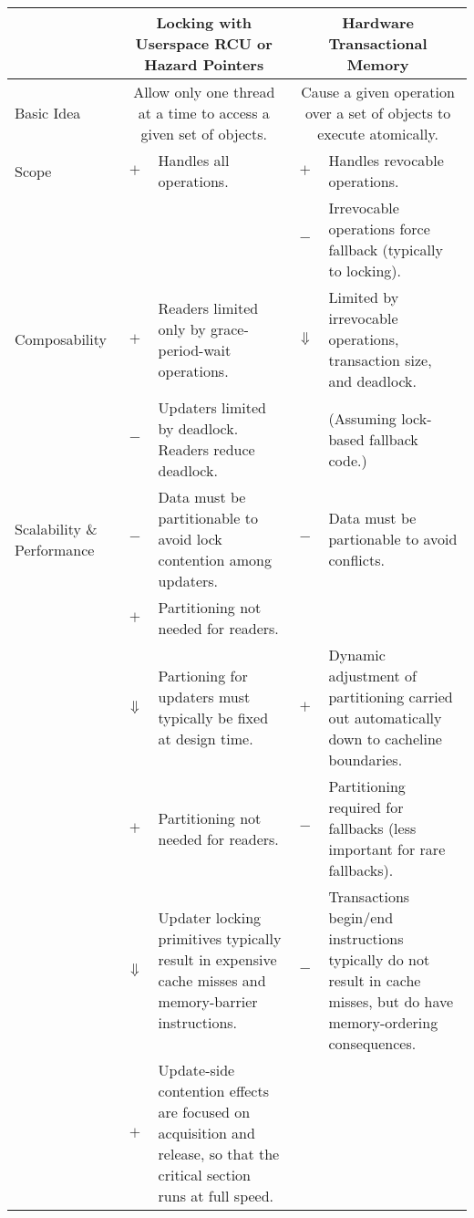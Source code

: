 
\begin{table*}[p]
\centering
\small\OneColumnHSpace{-.8in}
\begin{tabular}{p{1.0in}||c|p{2.0in}||c|p{2.0in}}
& \multicolumn{2}{c||}{Locking with Userspace RCU or Hazard Pointers} & \multicolumn{2}{c}{Hardware Transactional Memory} \\
\hline
\hline
Basic Idea
	& \multicolumn{2}{p{2.2in}||}{
	  Allow only one thread at a time to access a given set of objects.}
		& \multicolumn{2}{p{2.2in}}{
		  Cause a given operation over a set of objects to execute
		  atomically.} \\
\hline
\hline
Scope
	& $+$
	& Handles all operations.
		& $+$
		& Handles revocable operations. \\
\cline{4-5}
	& &
		& $-$
		& Irrevocable operations force fallback (typically
		  to locking). \\
\hline
Composability
	& $+$
	& Readers limited only by grace-period-wait operations.
		& $\Downarrow$
		& Limited by irrevocable operations, transaction size,
		  and deadlock. \\
\cline{2-3}
	& $-$
	& Updaters limited by deadlock.  Readers reduce deadlock.
		&
		& (Assuming lock-based fallback code.) \\
\hline
Scalability \& Performance
	& $-$
	& Data must be partitionable to avoid lock contention among
	  updaters.
		& $-$
		& Data must be partionable to avoid conflicts. \\
\cline{2-3}
	& $+$
	& Partitioning not needed for readers.
		&
		& \\
\cline{2-5}
	& $\Downarrow$
	& Partioning for updaters must typically be fixed at design time.
		& $+$
		& Dynamic adjustment of partitioning carried out
		  automatically down to cacheline boundaries. \\
\cline{2-5}
	& $+$
	& Partitioning not needed for readers.
		& $-$
		& Partitioning required for fallbacks (less important
		  for rare fallbacks). \\
\cline{2-5}
	& $\Downarrow$
	& Updater locking primitives typically result in expensive cache
	  misses and memory-barrier instructions.
		& $-$
		& Transactions begin/end instructions typically do not
		  result in cache misses, but do have memory-ordering
		  consequences. \\
\cline{2-5}
	& $+$
	& Update-side contention effects are focused on acquisition and
	  release, so that the critical section runs at full speed.

\end{tabular}
\end{table*}
